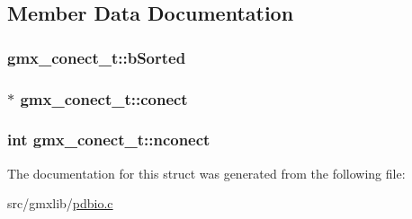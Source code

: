 \subsection{\-Member \-Data \-Documentation}
\hypertarget{structgmx__conect__t_a40a79f3b8bd15bbf6fc659367b4c889a}{
\subsubsection[{b\-Sorted}]{ {\bf gmx\-\_\-conect\-\_\-t\-::b\-Sorted}}}\label{structgmx__conect__t_a40a79f3b8bd15bbf6fc659367b4c889a}
\hypertarget{structgmx__conect__t_ab8fa72455f10e672302577d549f9beab}{
\subsubsection[{conect}]{$\ast$ {\bf gmx\-\_\-conect\-\_\-t\-::conect}}}\label{structgmx__conect__t_ab8fa72455f10e672302577d549f9beab}
\hypertarget{structgmx__conect__t_a1227b37b863596d73a32deda7be4017e}{
\subsubsection[{nconect}]{\setlength{\rightskip}{0pt plus 5cm}int {\bf gmx\-\_\-conect\-\_\-t\-::nconect}}}\label{structgmx__conect__t_a1227b37b863596d73a32deda7be4017e}


\-The documentation for this struct was generated from the following file\-:\begin{DoxyCompactItemize}
\item 
src/gmxlib/\hyperlink{pdbio_8c}{pdbio.\-c}\end{DoxyCompactItemize}
